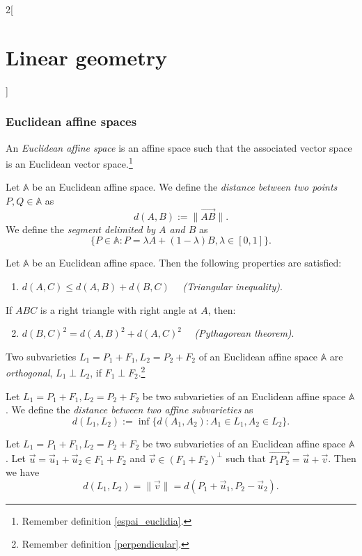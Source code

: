 \documentclass[class=article,10pt,crop=false]{standalone}
\begin{document}
\begin{multicols}{2}[\section{Linear geometry}]
\subsubsection{Euclidean affine spaces}
\begin{definition}
An \textit{Euclidean affine space} is an affine space such that the associated vector space is an Euclidean vector space.\footnote{Remember definition \ref{espai_euclidia}.}
\end{definition}
\begin{definition}
Let $\mathbb{A}$ be an Euclidean affine space. We define the \textit{distance between two points $P,Q\in\mathbb{A}$} as $$d(A,B):=\|\overrightarrow{AB}\|.$$ We define the \textit{segment delimited by $A$ and $B$} as $$\{P\in\mathbb{A}:P=\lambda A+(1-\lambda)B,\lambda\in[0,1]\}.$$
\end{definition}
\begin{prop}
Let $\mathbb{A}$ be an Euclidean affine space. Then the following properties are satisfied:
\begin{enumerate}
    \item $d(A,C)\leq d(A,B)+d(B,C)\quad$ \textit{(Triangular inequality)}.
\end{enumerate}
If $ABC$ is a right triangle with right angle at $A$, then:
\begin{enumerate}
    \setcounter{enumi}{1}
    \item $d(B,C)^2=d(A,B)^2+d(A,C)^2\quad$ \textit{(Pythagorean theorem)}.
\end{enumerate}
\end{prop}
\begin{definition}
Two subvarieties $L_1=P_1+F_1,L_2=P_2+F_2$ of an Euclidean affine space $\mathbb{A}$ are \textit{orthogonal}, $L_1\perp L_2$, if $F_1\perp F_2$.\footnote{Remember definition \ref{perpendicular}.}
\end{definition}
\begin{definition}
Let $L_1=P_1+F_1,L_2=P_2+F_2$ be two subvarieties of an Euclidean affine space $\mathbb{A}$. We define the \textit{distance between two affine subvarieties} as $$d(L_1,L_2):=\inf\{d(A_1,A_2):A_1\in L_1, A_2\in L_2\}.$$
\end{definition}
\begin{theorem}
Let $L_1=P_1+F_1,L_2=P_2+F_2$ be two subvarieties of an Euclidean affine space $\mathbb{A}$. Let $\overrightarrow{u}=\overrightarrow{u}_1+\overrightarrow{u}_2\in F_1+F_2$ and $\overrightarrow{v}\in(F_1+F_2)^\perp$ such that $\overrightarrow{P_1P_2}=\overrightarrow{u}+\overrightarrow{v}$. Then we have $$d(L_1,L_2)=\|\overrightarrow{v}\|=d(P_1+\overrightarrow{u}_1,P_2-\overrightarrow{u}_2).$$
\end{theorem}

\end{multicols}
\end{document}
